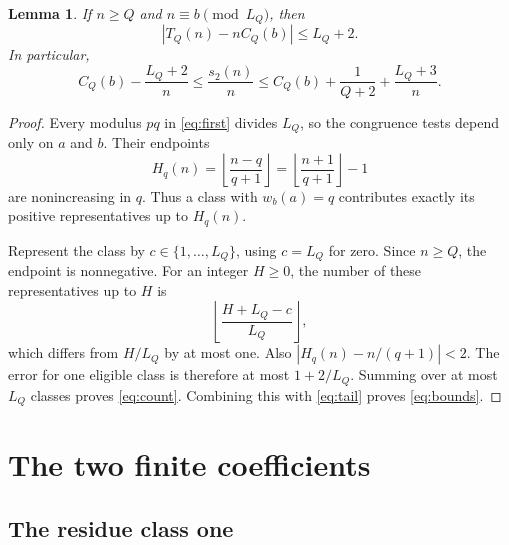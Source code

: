 \documentclass[11pt]{article}
\newtheorem{lemma}[theorem]{Lemma}
\begin{document}
\begin{lemma}\label{lem:count}
If $n\ge Q$ and $n\equiv b\pmod{L_Q}$, then
\begin{equation}\label{eq:count}
 |T_Q(n)-nC_Q(b)|\le L_Q+2.
\end{equation}
In particular,
\begin{equation}\label{eq:bounds}
 C_Q(b)-\frac{L_Q+2}{n}\le\frac{s_2(n)}n
 \le C_Q(b)+\frac1{Q+2}+\frac{L_Q+3}{n}.
\end{equation}
\end{lemma}
\begin{proof}
Every modulus $pq$ in \eqref{eq:first} divides $L_Q$, so the
congruence tests depend only on $a$ and $b$. Their endpoints
\[
 H_q(n)=\left\lfloor\frac{n-q}{q+1}\right\rfloor
       =\left\lfloor\frac{n+1}{q+1}\right\rfloor-1
\]
are nonincreasing in $q$. Thus a class with $w_b(a)=q$ contributes
exactly its positive representatives up to $H_q(n)$.

Represent the class by $c\in\{1,\ldots,L_Q\}$, using $c=L_Q$ for
zero. Since $n\ge Q$, the endpoint is nonnegative. For an integer
$H\ge0$, the number of these representatives up to $H$ is
\[
 \left\lfloor\frac{H+L_Q-c}{L_Q}\right\rfloor,
\]
which differs from $H/L_Q$ by at most one. Also
$|H_q(n)-n/(q+1)|<2$. The error for one eligible class is therefore
at most $1+2/L_Q$. Summing over at most $L_Q$ classes proves
\eqref{eq:count}. Combining this with \eqref{eq:tail} proves
\eqref{eq:bounds}.
\end{proof}

\section{The two finite coefficients}

\subsection{The residue class one}
\end{document}

